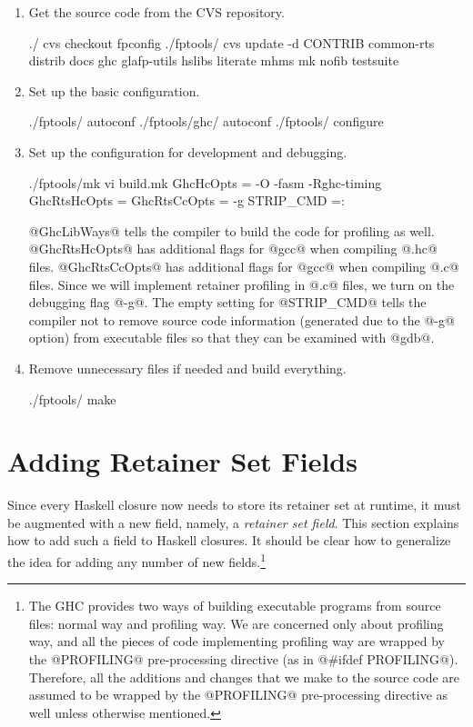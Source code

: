 \documentclass{article}
\begin{document}
\begin{enumerate}
\item Get the source code from the CVS repository.
\begin{code}
./              cvs checkout fpconfig
./fptools/      cvs update -d CONTRIB common-rts distrib docs ghc glafp-utils 
                    hslibs literate mhms mk nofib testsuite
\end{code}

\item Set up the basic configuration.
\begin{code}
./fptools/      autoconf                    
./fptools/ghc/  autoconf
./fptools/      configure
\end{code}

\item Set up the configuration for development and debugging.
\begin{code}
./fptools/mk    vi build.mk
    GhcHcOpts = -O -fasm -Rghc-timing
    GhcRtsHcOpts = 
    GhcRtsCcOpts = -g
    STRIP_CMD =:
\end{code}
@GhcLibWays@ tells the compiler to build the code for profiling as well.
@GhcRtsHcOpts@ has additional flags for @gcc@ when compiling @.hc@ files.
@GhcRtsCcOpts@ has additional flags for @gcc@ when compiling @.c@ files.
Since we will implement retainer profiling in @.c@ files, we turn on the 
debugging flag @-g@. 
The empty setting for @STRIP_CMD@ tells the compiler not to remove source code
information (generated due to the @-g@ option) from executable files so that
they can be examined with @gdb@.

\item Remove unnecessary files if needed and build everything.
\begin{code}
./fptools/      make
\end{code}
\end{enumerate}

\section{Adding Retainer Set Fields}

Since every Haskell closure now needs to store its retainer set at runtime, 
it must be augmented with a new field,
namely, a \emph{retainer set field}.
This section explains how to add such a field to Haskell closures.
It should be clear how to generalize the idea for adding 
any number of new fields.\footnote{The GHC provides two 
ways of building executable programs from 
source files: normal way and profiling way. 
We are concerned only about profiling way, and all the pieces of code 
implementing profiling way are wrapped by the @PROFILING@ 
pre-processing directive (as in @\#ifdef PROFILING@).
Therefore, all the additions and changes that we make to the source code 
are assumed to be wrapped by the @PROFILING@ pre-processing 
directive as well unless otherwise mentioned.}
\end{document}
